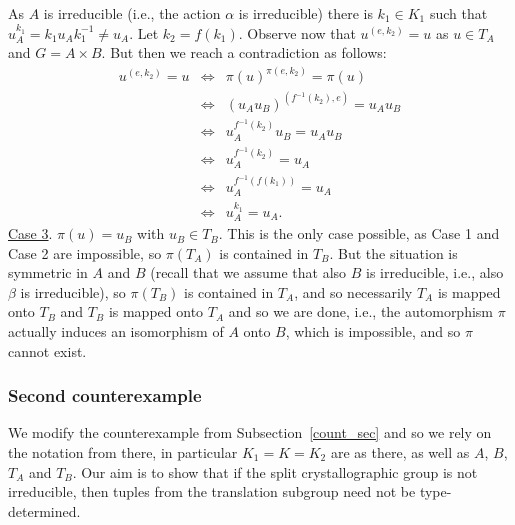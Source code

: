 \documentclass[a4paper, 11pt]{amsart}
\theoremstyle{definition}
\theoremstyle{remark}
\begin{document}
\newline As $A$ is irreducible (i.e., the action $\alpha$ is irreducible) there is $k_1 \in K_1$ such that $u_A^{k_1}=k_1u_A{k^{-1}_1} \neq u_A$. Let $k_2 = f(k_1)$. Observe now that $u^{(e, k_2)} = u$ as $u \in T_A$ and $G = A \times B$. But then we reach a contradiction as follows:
\[ \begin{array}{rcl}	
u^{(e, k_2)} = u
& \Leftrightarrow & \pi(u)^{\pi(e, k_2)} = \pi(u)\\
& \Leftrightarrow & (u_Au_B)^{(f^{-1}(k_2), e)} = u_Au_B\\
& \Leftrightarrow & u^{f^{-1}(k_2)}_A u_B = u_A u_B\\
& \Leftrightarrow & u^{f^{-1}(k_2)}_A = u_A \\
& \Leftrightarrow & u^{f^{-1}(f(k_1))}_A = u_A \\
& \Leftrightarrow & u_A^{k_1} = u_A.
\end{array} \]
\newline \underline{Case 3}. $\pi(u) = u_B$ with $u_B \in T_B$.
\newline This is the only case possible, as Case 1 and Case 2 are impossible, so $\pi(T_A)$ is contained in $T_B$. But the situation is symmetric in $A$ and $B$ (recall that we assume that also $B$ is irreducible, i.e., also $\beta$ is irreducible), so $\pi(T_B)$ is contained in $T_A$, and so necessarily $T_A$ is mapped onto $T_B$ and $T_B$ is mapped onto $T_A$ and so we are done, i.e., the automorphism $\pi$ actually induces an isomorphism of $A$ onto $B$, which is impossible, and so $\pi$ cannot exist.



\subsubsection{Second counterexample}\label{another_count_sec}

We modify the counterexample from Subsection~\ref{count_sec} and so we rely on the notation from there, in particular $K_1 = K = K_2$ are as there, as well as $A$, $B$, $T_A$ and $T_B$. Our aim is to show that if the split crystallographic group is not irreducible, then tuples from the translation subgroup need not be type-determined. 
	
\end{document}
